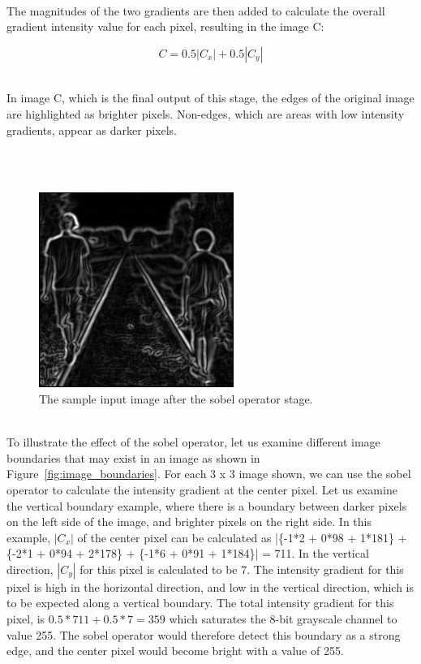 \documentclass[epsfig,10pt,fullpage]{article}
\begin{document}
~\\
\noindent
The magnitudes of the two gradients are then added to calculate the overall gradient intensity value for each pixel, resulting in the image C:

\[
C = 0.5|C_x| + 0.5|C_y|
\]

~\\
\noindent
In image C, which is the final output of this stage, the edges of the original image are highlighted as brighter pixels. Non-edges, which are areas with low intensity gradients, appear as darker pixels.

~\\
~\\
\begin{figure}[H]
   \begin{center}
       \includegraphics[scale = 0.85]{figures/fig_stage3_sobel.png}
   \end{center}
   \caption{The sample input image after the sobel operator stage.}
	\label{fig:sample_stage3}
\end{figure}

~\\
\noindent
To illustrate the effect of the sobel operator, let us examine different image boundaries that may exist in an image as shown in Figure~\ref{fig:image_boundaries}. For each 3 x 3 image shown, we can use the sobel operator to calculate the intensity gradient at the center pixel. Let us examine the vertical boundary example, where there is a boundary between darker pixels on the left side of the image, and brighter pixels on the right side. In this example, $|C_x|$ of the center pixel can be calculated as |\{-1*2 + 0*98 + 1*181\} + \{-2*1 + 0*94 + 2*178\} + \{-1*6 + 0*91 + 1*184\}| = 711. In the vertical direction, $|C_y|$ for this pixel is calculated to be 7. The intensity gradient for this pixel is high in the horizontal direction, and low in the vertical direction, which is to be expected along a vertical boundary. The total intensity gradient for this pixel, is $0.5*711 + 0.5*7 = 359$ which saturates the 8-bit grayscale channel to value 255. The sobel operator would therefore detect this boundary as a strong edge, and the center pixel would become bright with a value of 255.
\end{document}
